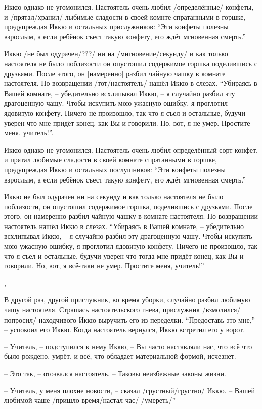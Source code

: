 \begin{ver}
Иккю однако не угомонился. Настоятель очень
любил /определённые/ конфеты, и /прятал/хранил/
лыбимые сладости в своей комнте спратанными в горшке, предупреждая
Иккю и остальных прислужников: ``Эти конфеты
полезны взрослым, а если ребёнок съест такую конфету,
его ждёт мгновенная смерть.''

Иккю /не был одурачен/???/ ни на /мнгновение/секунду/ и как только
настоятеля не было поблизости он опустошил содержимое горшка
поделившись с друзьями. После этого, он [намеренно] разбил чайную
чашку в комнате настоятеля. По возвращении /тот/настоятель/ нашёл Иккю в
слезах.
``Убираясь в Вашей комнате, -- убедительно всхлипывал Иккю, -- я
случайно разбил эту драгоценную чашу. Чтобы искупить мою ужасную
ошибку, я проглотил ядовитую конфету. Ничего не произошло, так что я
съел и остальные, будучи уверен что мне придёт конец, как Вы и
говорили. Но, вот, я не умер. Простите меня, учитель!''. 
\end{ver}

\begin{ver}[1]
Иккю однако не угомонился. Настоятель очень
любил определённый сорт конфет, и прятал
любимые сладости в своей комнате спратанными в горшке, предупреждая
Иккю и остальных послушников: ``Эти конфеты
полезны взрослым, а если ребёнок съест такую конфету,
его ждёт мгновенная смерть.''

Иккю не был одурачен ни на секунду и как только
настоятеля не было поблизости, он опустошил содержимое горшка,
поделившись с друзьями. После этого, он намеренно разбил чайную
чашку в комнате настоятеля. По возвращении настоятель нашёл Иккю в
слезах.
``Убираясь в Вашей комнате, -- убедительно всхлипывал Иккю, -- я
случайно разбил эту драгоценную чашу. Чтобы искупить мою ужасную
ошибку, я проглотил ядовитую конфету. Ничего не произошло, так что я
съел и остальные, будучи уверен что тогда мне придёт конец, как Вы и
говорили. Но, вот, я всё-таки не умер. Простите меня, учитель!''
\end{ver}
\sep
\begin{ver}
В другой раз, другой прислужник, во время уборки, случайно разбил любимую чашу
настоятеля. Страшась настоятельского гнева, прислужник
/взмолился/попросил/ находчивого Иккю выручить его из переделки. ``Предоставь это мне,'' -- успокоил его Иккю.
Когда настоятель вернулся, Иккю встретил его у ворот.

-- Учитель, -- подступился к нему
Иккю, -- Вы часто наставляли нас, что всё что было рождено, умрёт, и
всё, что обладает материальной формой,
исчезнет.

-- Это так, -- отозвался настоятель. -- Таковы неизбежные
законы жизни.

-- Учитель, у меня плохие новости, -- сказал /грустный/грустно/ Иккю.
-- Вашей любимой чаше /пришло время/настал час/ /умереть/''
\end{ver}

